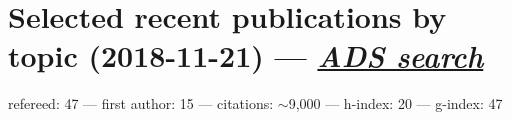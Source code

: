 \documentclass[12pt, letterpaper]{apw-cv}
\begin{document}


\section*{Selected recent publications by topic (2018-11-21) --- \href{\adsurl}{{\it ADS search}}}
\vspace{-1em}
    refereed: 47 ---
    first author: 15 ---
    citations: $\sim$9,000 ---
    h-index: 20 ---
    g-index: 47
\end{document}
